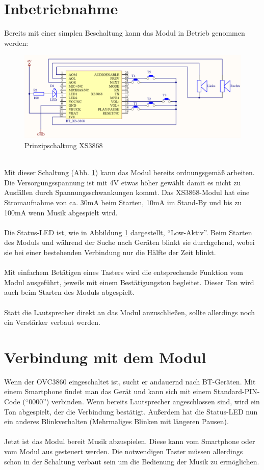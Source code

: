 \section{Inbetriebnahme}
Bereits mit einer simplen Beschaltung kann das Modul in Betrieb genommen werden:
\begin{figure} [h]
	\centering
	\includegraphics[width=1\textwidth]{schaltungen/XS3868_Prinzipschaltung.png}
	\caption{Prinzipschaltung XS3868}\label {fig:abb2.3}
\end{figure} \\
Mit dieser Schaltung (Abb. \ref {fig:abb2.3}) kann das Modul bereits ordnungsgemäß arbeiten.\\
Die Versorgungsspannung ist mit 4V etwas höher gewählt damit es nicht zu Ausfällen durch Spannungsschwankungen kommt. Das XS3868-Modul hat eine Stromaufnahme von ca. 30mA beim Starten, 10mA im Stand-By und bis zu 100mA wenn Musik abgespielt wird.\\ \\
Die Status-LED ist, wie in Abbildung \ref {fig:abb2.3} dargestellt, \enquote{Low-Aktiv}. Beim Starten des Moduls und während der Suche nach Geräten blinkt sie durchgehend, wobei sie bei einer bestehenden Verbindung nur die Hälfte der Zeit blinkt.\\ \\
Mit einfachem Betätigen eines Tasters wird die entsprechende Funktion vom Modul ausgeführt, jeweils mit einem Bestätigungston begleitet. Dieser Ton wird auch beim Starten des Moduls abgespielt.\\ \\
Statt die Lautsprecher direkt an das Modul anzuschließen, sollte allerdings noch ein Verstärker verbaut werden.
\newpage


\section{Verbindung mit dem Modul}
Wenn der OVC3860 eingeschaltet ist, sucht er andauernd nach BT-Geräten. Mit einem Smartphone findet man das Gerät und kann sich mit einem Standard-PIN-Code (\enquote{0000}) verbinden. Wenn bereits Lautsprecher angeschlossen sind, wird ein Ton abgespielt, der die Verbindung bestätigt. Außerdem hat die Status-LED nun ein anderes Blinkverhalten (Mehrmaliges Blinken mit längeren Pausen).\\ \\
Jetzt ist das Modul bereit Musik abzuspielen. Diese kann vom Smartphone oder vom Modul aus gesteuert werden. Die notwendigen Taster müssen allerdings schon in der Schaltung verbaut sein um die Bedienung der Musik zu ermöglichen.



